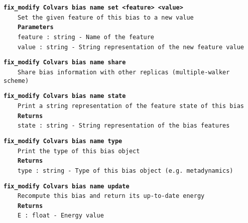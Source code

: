 \begin{mdexampleinput}{}
\texttt{\textbf{fix\_modify Colvars bias name set <feature> <value>}}
\\
\-~~~~\texttt{Set the given feature of this bias to a new value}
\\
\-~~~~\texttt{\textbf{Parameters}}
\\
\-~~~~\texttt{feature : string - Name of the feature}
\\
\-~~~~\texttt{value : string - String representation of the new feature value}
\end{mdexampleinput}
\begin{mdexampleinput}{}
\texttt{\textbf{fix\_modify Colvars bias name share}}
\\
\-~~~~\texttt{Share bias information with other replicas (multiple-walker scheme)}
\end{mdexampleinput}
\begin{mdexampleinput}{}
\texttt{\textbf{fix\_modify Colvars bias name state}}
\\
\-~~~~\texttt{Print a string representation of the feature state of this bias}
\\
\-~~~~\texttt{\textbf{Returns}}
\\
\-~~~~\texttt{state : string - String representation of the bias features}
\end{mdexampleinput}
\begin{mdexampleinput}{}
\texttt{\textbf{fix\_modify Colvars bias name type}}
\\
\-~~~~\texttt{Print the type of this bias object}
\\
\-~~~~\texttt{\textbf{Returns}}
\\
\-~~~~\texttt{type : string - Type of this bias object (e.g. metadynamics)}
\end{mdexampleinput}
\begin{mdexampleinput}{}
\texttt{\textbf{fix\_modify Colvars bias name update}}
\\
\-~~~~\texttt{Recompute this bias and return its up-to-date energy}
\\
\-~~~~\texttt{\textbf{Returns}}
\\
\-~~~~\texttt{E : float - Energy value}
\end{mdexampleinput}
